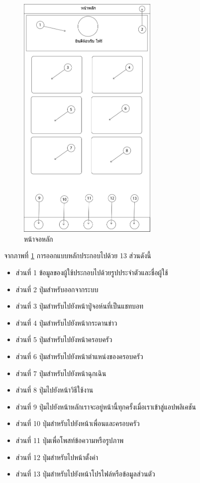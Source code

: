 		\begin{figure}[H]
			\centering
			\includegraphics[width=0.6\textwidth]{Figures/3/UI/main}
			\caption{หน้าจอหลัก}
			\label{Fig:หน้าจอหลัก}
		\end{figure}
		จากภาพที่ \ref{Fig:หน้าจอหลัก} การออกแบบหลักประกอบไปด้วย 13 ส่วนดังนี้
		\begin{itemize}
			\item ส่วนที่ 1 ข้อมูลของผู้ใช้ประกอบไปด้วยรูปประจำตัวและชื่อผู้ใช้
			\item ส่วนที่ 2 ปุ่มสำหรับออกจากระบบ
			\item ส่วนที่ 3 ปุ่มสำหรับไปยังหน้าปู่จอห์นที่เป็นแชทบอท
			\item ส่วนที่ 4 ปุ่มสำหรับไปยังหน้ากระดานข่าว
			\item ส่วนที่ 5 ปุ่มสำหรับไปยังหน้าครอบครัว
			\item ส่วนที่ 6 ปุ่มสำหรับไปยังหน้าตำแหน่งของครอบครัว
			\item ส่วนที่ 7 ปุ่มสำหรับไปยังหน้าฉุกเฉิน
			\item ส่วนที่ 8 ปุ่มไปยังหน้าวิธีใช้งาน
			\item ส่วนที่ 9 ปุ่มไปยังหน้าหลักเราจะอยู่หน้านี้ทุกครั้งเมื่อเราเข้าสู่แอปพลิเคชัน
			\item ส่วนที่ 10 ปุ่มสำหรับไปยังหน้าเพื่อนและครอบครัว
			\item ส่วนที่ 11 ปุ่มเพื่อโพสท์ข้อความหรือรูปภาพ
			\item ส่วนที่ 12 ปุ่มสำหรับไปหน้าตั้งค่า
			\item ส่วนที่ 13 ปุ่มสำหรับไปยังหน้าโปรไฟล์หรือข้อมูลส่วนตัว
		\end{itemize}

